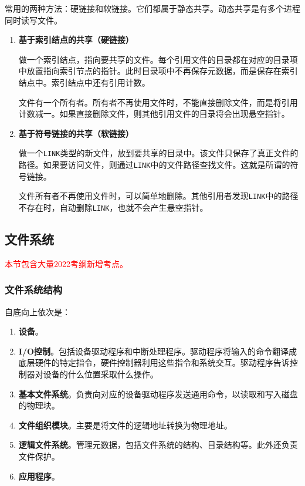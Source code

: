 \documentclass[12pt, a4paper, oneside]{ctexart}
\begin{document}
常用的两种方法：硬链接和软链接。它们都属于静态共享。动态共享是有多个进程同时读写文件。
\begin{enumerate}
  \item {\bf 基于索引结点的共享（硬链接）}
  
  做一个索引结点，指向要共享的文件。每个引用文件的目录都在对应的目录项中放置指向索引节点的指针。此时目录项中不再保存元数据，而是保存在索引结点中。索引结点中还有引用计数。

  文件有一个所有者。所有者不再使用文件时，不能直接删除文件，而是将引用计数减一。如果直接删除文件，则其他引用文件的目录将会出现悬空指针。

  \item {\bf 基于符号链接的共享（软链接）}
  
  做一个\verb|LINK|类型的新文件，放到要共享的目录中。该文件只保存了真正文件的路径。如果要访问文件，则通过\verb|LINK|中的文件路径查找文件。这就是所谓的符号链接。

  文件所有者不再使用文件时，可以简单地删除。其他引用者发现\verb|LINK|中的路径不存在时，自动删除\verb|LINK|，也就不会产生悬空指针。
\end{enumerate}

\subsection{文件系统}

\textcolor{red}{本节包含大量2022考纲新增考点。}

\subsubsection{文件系统结构}

自底向上依次是：
\begin{enumerate}
  \item {\bf 设备}。
  \item {\bf I/O控制}。包括设备驱动程序和中断处理程序。驱动程序将输入的命令翻译成底层硬件的特定指令，硬件控制器利用这些指令和系统交互。驱动程序告诉控制器对设备的什么位置采取什么操作。
  \item {\bf 基本文件系统}。负责向对应的设备驱动程序发送通用命令，以读取和写入磁盘的物理块。
  \item {\bf 文件组织模块}。主要是将文件的逻辑地址转换为物理地址。
  \item {\bf 逻辑文件系统}。管理元数据，包括文件系统的结构、目录结构等。此外还负责文件保护。
  \item {\bf 应用程序}。
\end{enumerate}
\end{document}
